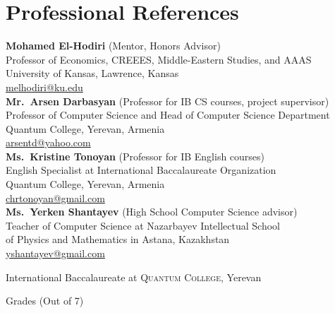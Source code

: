 \documentclass[a4paper,10pt]{article}
\begin{document}
\section{Professional References}

\textbf{Mohamed El-Hodiri} (Mentor, Honors Advisor)\\
Professor of Economics, CREEES, Middle-Eastern Studies, and AAAS\\
University of Kansas, Lawrence, Kansas\\
\href{mailto:melhodiri@ku.edu}{melhodiri@ku.edu}\\

\textbf{Mr.\ Arsen Darbasyan} (Professor for IB CS courses, project supervisor)\\
Professor of Computer Science and Head of Computer Science Department\\
Quantum College, Yerevan, Armenia\\
\href{mailto:arsentd@yahoo.com}{arsentd@yahoo.com}\\

\textbf{Ms.\ Kristine Tonoyan} (Professor for IB English courses)\\
English Specialist at International Baccalaureate Organization\\
Quantum College, Yerevan, Armenia\\
\href{mailto:chrtonoyan@gmail.com}{chrtonoyan@gmail.com}\\

\textbf{Ms.\ Yerken Shantayev} (High School Computer Science advisor)\\
Teacher of Computer Science at Nazarbayev Intellectual School \\of Physics and Mathematics in Astana, Kazakhstan\\
\href{mailto:yshantayev@gmail.com}{yshantayev@gmail.com}\\

\newpage
\par{\centering\Large \hypertarget{ib_grades}{International Baccalaureate at \textsc{Quantum College}, Yerevan}\par}\large{\centering Grades (Out of 7) \par}\normalsize
\end{document}
